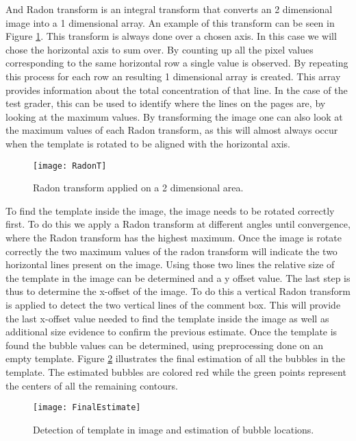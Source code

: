 And Radon transform is an integral transform that converts an 2 dimensional image into a 1 dimensional array. An example of this transform can be seen in Figure \ref{fig:RadonT}. This transform is always done over a chosen axis. In this case we will chose the horizontal axis to sum over. By counting up all the pixel values corresponding to the same horizontal row a single value is observed. By repeating this process for each row an resulting 1 dimensional array is created. This array provides information about the total concentration of that line. In the case of the test grader, this can be used to identify where the lines on the pages are, by looking at the maximum values. By transforming the image one can also look at the maximum values of each Radon transform, as this will almost always occur when the template is rotated to be aligned with the horizontal axis.

\begin{figure}
  \centering
  \texttt{[image: RadonT]}\\
  \caption{Radon transform applied on a 2 dimensional area.}
  \label{fig:RadonT}
\end{figure}

To find the template inside the image, the image needs to be rotated correctly first. To do this we apply a Radon transform at different angles until convergence, where the Radon transform has the highest maximum. Once the image is rotate correctly the two maximum values of the radon transform will indicate the two horizontal lines present on the image. Using those two lines the relative size of the template in the image can be determined and a y offset value. The last step is thus to determine the x-offset of the image. To do this a vertical Radon transform is applied to detect the two vertical lines of the comment box. This will provide the last x-offset value needed to find the template inside the image as well as additional size evidence to confirm the previous estimate. Once the template is found the bubble values can be determined, using preprocessing done on an empty template. Figure \ref{fig:FinalEstimate} illustrates the final estimation of all the bubbles in the template. The estimated bubbles are colored red while the green points represent the centers of all the remaining contours.

\begin{figure}
  \centering
  \texttt{[image: FinalEstimate]}\\
  \caption{Detection of template in image and estimation of bubble locations.}
  \label{fig:FinalEstimate}
\end{figure}

